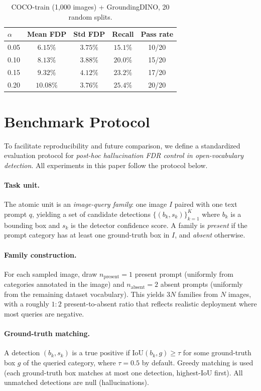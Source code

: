 \documentclass{article}
\theoremstyle{remark}
\newcommand{\1}{\mathbf{1}}
\begin{document}
\begin{table}[h]
\centering
\small
\caption{COCO-train (1{,}000 images) + GroundingDINO, 20 random splits.}
\label{tab:coco_train}
\begin{tabular}{lcccc}
\toprule
$\alpha$ & Mean FDP & Std FDP & Recall & Pass rate \\
\midrule
0.05 & $6.15\%$ & $3.75\%$ & $15.1\%$ & 10/20 \\
0.10 & $8.13\%$ & $3.88\%$ & $20.0\%$ & 15/20 \\
0.15 & $9.32\%$ & $4.12\%$ & $23.2\%$ & 17/20 \\
0.20 & $10.08\%$ & $3.76\%$ & $25.4\%$ & 20/20 \\
\bottomrule
\end{tabular}
\end{table}

\section{Benchmark Protocol}
\label{app:benchmark}

To facilitate reproducibility and future comparison, we define a standardized
evaluation protocol for \emph{post-hoc hallucination FDR control in
open-vocabulary detection}. All experiments in this paper follow the protocol
below.

\paragraph{Task unit.}
The atomic unit is an \emph{image-query family}: one image $I$ paired with
one text prompt $q$, yielding a set of candidate detections
$\{(b_k, s_k)\}_{k=1}^{K}$ where $b_k$ is a bounding box and $s_k$ is the
detector confidence score. A family is \emph{present} if the prompt category
has at least one ground-truth box in $I$, and \emph{absent} otherwise.

\paragraph{Family construction.}
For each sampled image, draw $n_{\mathrm{present}}=1$ present prompt
(uniformly from categories annotated in the image) and
$n_{\mathrm{absent}}=2$ absent prompts (uniformly from the remaining
dataset vocabulary). This yields $3N$ families from $N$ images, with a
roughly $1{:}2$ present-to-absent ratio that reflects realistic deployment
where most queries are negative.

\paragraph{Ground-truth matching.}
A detection $(b_k, s_k)$ is a true positive if
$\mathrm{IoU}(b_k, g) \ge \tau$ for some ground-truth box $g$ of the
queried category, where $\tau=0.5$ by default. Greedy matching is used
(each ground-truth box matches at most one detection, highest-IoU first).
All unmatched detections are null (hallucinations).
\end{document}
